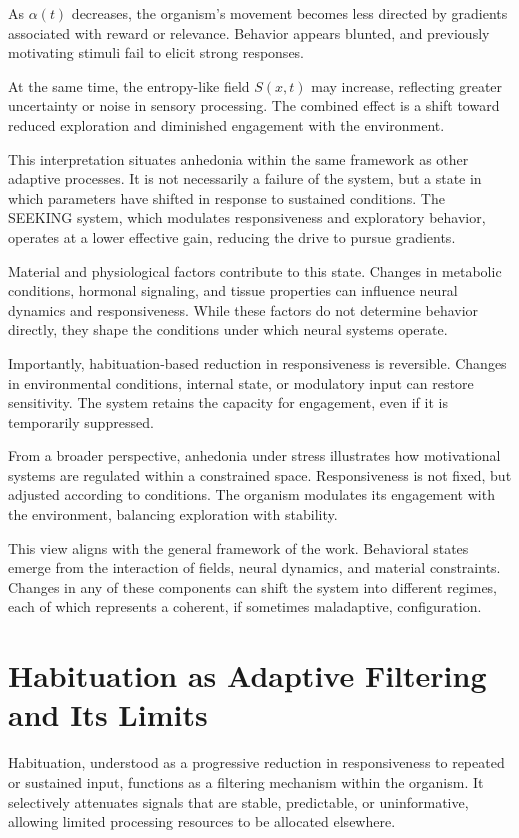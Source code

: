 \documentclass[11pt,oneside]{book}
\begin{document}
As $\alpha(t)$ decreases, the organism’s movement becomes less directed by gradients associated with reward or relevance. Behavior appears blunted, and previously motivating stimuli fail to elicit strong responses.

At the same time, the entropy-like field $S(x,t)$ may increase, reflecting greater uncertainty or noise in sensory processing. The combined effect is a shift toward reduced exploration and diminished engagement with the environment.

This interpretation situates anhedonia within the same framework as other adaptive processes. It is not necessarily a failure of the system, but a state in which parameters have shifted in response to sustained conditions. The SEEKING system, which modulates responsiveness and exploratory behavior, operates at a lower effective gain, reducing the drive to pursue gradients.

Material and physiological factors contribute to this state. Changes in metabolic conditions, hormonal signaling, and tissue properties can influence neural dynamics and responsiveness. While these factors do not determine behavior directly, they shape the conditions under which neural systems operate.

Importantly, habituation-based reduction in responsiveness is reversible. Changes in environmental conditions, internal state, or modulatory input can restore sensitivity. The system retains the capacity for engagement, even if it is temporarily suppressed.

From a broader perspective, anhedonia under stress illustrates how motivational systems are regulated within a constrained space. Responsiveness is not fixed, but adjusted according to conditions. The organism modulates its engagement with the environment, balancing exploration with stability.

This view aligns with the general framework of the work. Behavioral states emerge from the interaction of fields, neural dynamics, and material constraints. Changes in any of these components can shift the system into different regimes, each of which represents a coherent, if sometimes maladaptive, configuration.

\section{Habituation as Adaptive Filtering and Its Limits}

Habituation, understood as a progressive reduction in responsiveness to repeated or sustained input, functions as a filtering mechanism within the organism. It selectively attenuates signals that are stable, predictable, or uninformative, allowing limited processing resources to be allocated elsewhere.
\end{document}
